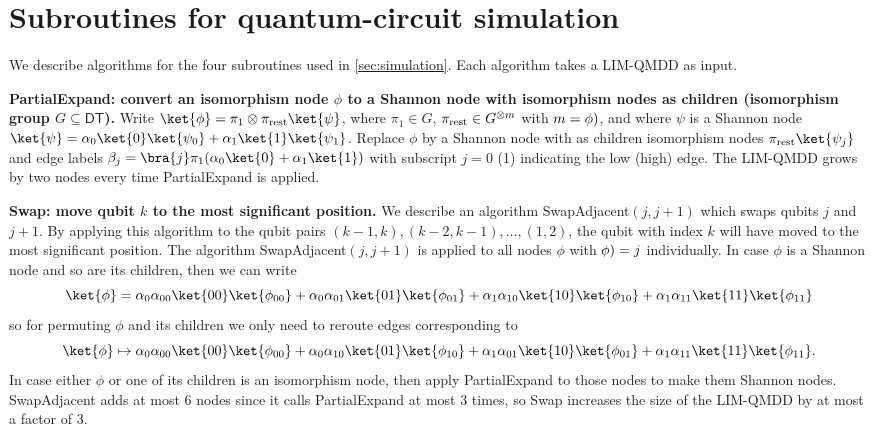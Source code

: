 \section{Subroutines for quantum-circuit simulation}
\label{sec:update-algorithms}

We describe algorithms for the four subroutines used in \autoref{sec:simulation}.
Each algorithm takes a LIM-QMDD as input.

            \textbf{\textsf{PartialExpand}: convert an isomorphism node $\phi$ to a Shannon node with isomorphism nodes as children (isomorphism group $G \subseteq \textsf{DT}$).}
        Write $\ket{\phi} = \pi_1 \otimes \pi_{\rm rest} \ket{\psi}$, where $\pi_1 \in G$, $\pi_{\rm rest} \in G^{\otimes m}$ with $m=\index(\phi)$, and where $\psi$ is a Shannon node $\ket{\psi} = \alpha_0\ket{0}\ket{\psi_0} + \alpha_1\ket{1}\ket{\psi_1}$.
       Replace $\phi$ by a Shannon node with as children isomorphism nodes $\pi_{\rm rest}\ket{\psi_j}$ and edge labels $\beta_j = \bra{j} \pi_1 (\alpha_0\ket{0} + \alpha_1\ket{1})$ with subscript $j=0$ (1) indicating the low (high) edge.
        The LIM-QMDD grows by two nodes every time \textsf{PartialExpand} is applied.




               \textbf{\textsf{Swap}: move qubit $k$ to the most significant position.}
               We describe an algorithm \textsf{SwapAdjacent}$(j, j+1)$ which swaps qubits $j$ and $j+1$. 
               By applying this algorithm to the qubit pairs $(k-1, k), (k-2, k-1), \dots, (1, 2)$, the qubit with index $k$ will have moved to the most significant position.
               The algorithm \textsf{SwapAdjacent}$(j, j+1)$ is applied to all nodes $\phi$ with $\index(\phi)=j$ individually.
In case $\phi$ is a Shannon node and so are its children, then we can write 
        \[
\ket{\phi} =
\alpha_0\alpha_{00}\ket{00}\ket{\phi_{00}}
+
\alpha_0\alpha_{01}\ket{01}\ket{\phi_{01}}
+
\alpha_1\alpha_{10}\ket{10}\ket{\phi_{10}}
+
\alpha_1\alpha_{11}\ket{11}\ket{\phi_{11}}
\]
so for permuting $\phi$ and its children we only need to reroute edges corresponding to
        \[
\ket{\phi} \mapsto
\alpha_0\alpha_{00}\ket{00}\ket{\phi_{00}}
+
\alpha_0\alpha_{10}\ket{01}\ket{\phi_{10}}
+
\alpha_1\alpha_{01}\ket{10}\ket{\phi_{01}}
+
\alpha_1\alpha_{11}\ket{11}\ket{\phi_{11}}
.
\]
        In case either $\phi$ or one of its children is an isomorphism node, then apply \textsf{PartialExpand} to those nodes to make them Shannon nodes.
        \textsf{SwapAdjacent} adds at most 6 nodes since it calls \textsf{PartialExpand} at most 3 times, so \textsf{Swap} increases the size of the LIM-QMDD by at most a factor of 3.

